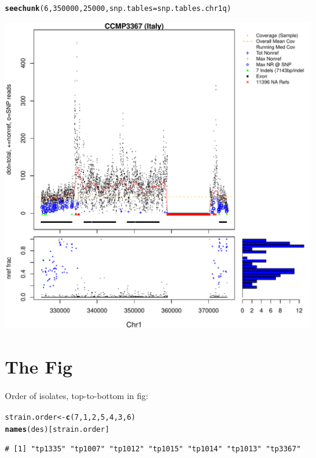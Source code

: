\documentclass{article}\usepackage[]{graphicx}\usepackage[]{color}
\makeatletter
\def\maxwidth{ %
  \ifdim\Gin@nat@width>\linewidth
    \linewidth
  \else
    \Gin@nat@width
  \fi
}
\newcommand{\hlnum}[1]{\textcolor[rgb]{0.686,0.059,0.569}{#1}}%
\newcommand{\hlstd}[1]{\textcolor[rgb]{0.345,0.345,0.345}{#1}}%
\newcommand{\hlkwb}[1]{\textcolor[rgb]{0.69,0.353,0.396}{#1}}%
\newcommand{\hlkwc}[1]{\textcolor[rgb]{0.333,0.667,0.333}{#1}}%
\newcommand{\hlkwd}[1]{\textcolor[rgb]{0.737,0.353,0.396}{\textbf{#1}}}%
\newenvironment{kframe}{%
 \def\at@end@of@kframe{}%
 \ifinner\ifhmode%
  \def\at@end@of@kframe{\end{minipage}}%
  \begin{minipage}{\columnwidth}%
 \fi\fi%
 \def\FrameCommand##1{\hskip\@totalleftmargin \hskip-\fboxsep
 \colorbox{shadecolor}{##1}\hskip-\fboxsep
     \hskip-\linewidth \hskip-\@totalleftmargin \hskip\columnwidth}%
 \MakeFramed {\advance\hsize-\width
   \@totalleftmargin\z@ \linewidth\hsize
   \@setminipage}}%
 {\par\unskip\endMakeFramed%
 \at@end@of@kframe}
\newenvironment{knitrout}{}{} %
\makeatother
\begin{document}
\begin{knitrout}\footnotesize
{}\color{fgcolor}\begin{kframe}
\begin{alltt}
\hlkwd{seechunk}\hlstd{(}\hlnum{6}\hlstd{,}\hlnum{350000}\hlstd{,}\hlnum{25000}\hlstd{,}\hlkwc{snp.tables}\hlstd{=snp.tables.chr1q)}
\end{alltt}
\end{kframe}
\includegraphics[width=\maxwidth]{Fig2A-desert-distribution-figs-knitr/unnamed-chunk-20-1} 

\end{knitrout}

\section{The Fig}

Order of isolates, top-to-bottom in fig:
\begin{knitrout}\footnotesize
{}\color{fgcolor}\begin{kframe}
\begin{alltt}
\hlstd{strain.order} \hlkwb{<-} \hlkwd{c}\hlstd{(}\hlnum{7}\hlstd{,}\hlnum{1}\hlstd{,}\hlnum{2}\hlstd{,}\hlnum{5}\hlstd{,}\hlnum{4}\hlstd{,}\hlnum{3}\hlstd{,}\hlnum{6}\hlstd{)}
\hlkwd{names}\hlstd{(des)[strain.order]}
\end{alltt}
\begin{verbatim}
# [1] "tp1335" "tp1007" "tp1012" "tp1015" "tp1014" "tp1013" "tp3367"
\end{verbatim}
\end{kframe}
\end{knitrout}
\end{document}
